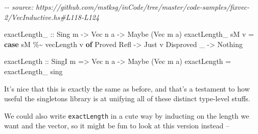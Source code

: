 \documentclass[]{article}
\newenvironment{Shaded}{}{}
\newcommand{\CommentTok}[1]{\textcolor[rgb]{0.38,0.63,0.69}{\textit{#1}}}
\newcommand{\DataTypeTok}[1]{\textcolor[rgb]{0.56,0.13,0.00}{#1}}
\newcommand{\KeywordTok}[1]{\textcolor[rgb]{0.00,0.44,0.13}{\textbf{#1}}}
\newcommand{\NormalTok}[1]{#1}
\newcommand{\OperatorTok}[1]{\textcolor[rgb]{0.40,0.40,0.40}{#1}}
\newcommand{\OtherTok}[1]{\textcolor[rgb]{0.00,0.44,0.13}{#1}}
\begin{document}
\begin{Shaded}
\begin{Highlighting}[]
\CommentTok{{-}{-} source: https://github.com/mstksg/inCode/tree/master/code{-}samples/fixvec{-}2/VecInductive.hs\#L118{-}L124}

\OtherTok{exactLength\_ ::} \DataTypeTok{Sing}\NormalTok{ m }\OtherTok{{-}>} \DataTypeTok{Vec}\NormalTok{ n a }\OtherTok{{-}>} \DataTypeTok{Maybe}\NormalTok{ (}\DataTypeTok{Vec}\NormalTok{ m a)}
\NormalTok{exactLength\_ sM v }\OtherTok{=} \KeywordTok{case}\NormalTok{ sM }\OperatorTok{\%\textasciitilde{}}\NormalTok{ vecLength v }\KeywordTok{of}
    \DataTypeTok{Proved} \DataTypeTok{Refl} \OtherTok{{-}>} \DataTypeTok{Just}\NormalTok{ v}
    \DataTypeTok{Disproved}\NormalTok{ \_ }\OtherTok{{-}>} \DataTypeTok{Nothing}

\OtherTok{exactLength ::} \DataTypeTok{SingI}\NormalTok{ m }\OtherTok{=>} \DataTypeTok{Vec}\NormalTok{ n a }\OtherTok{{-}>} \DataTypeTok{Maybe}\NormalTok{ (}\DataTypeTok{Vec}\NormalTok{ m a)}
\NormalTok{exactLength }\OtherTok{=}\NormalTok{ exactLength\_ sing}
\end{Highlighting}
\end{Shaded}

It's nice that this is exactly the same as before, and that's a testament to how
useful the singletons library is at unifying all of these distinct type-level
stuffs.

We could also write \texttt{exactLength} in a cute way by inducting on the
length we want and the vector, so it might be fun to look at this version
instead --

\begin{Shaded}
\end{Shaded}
\end{document}
